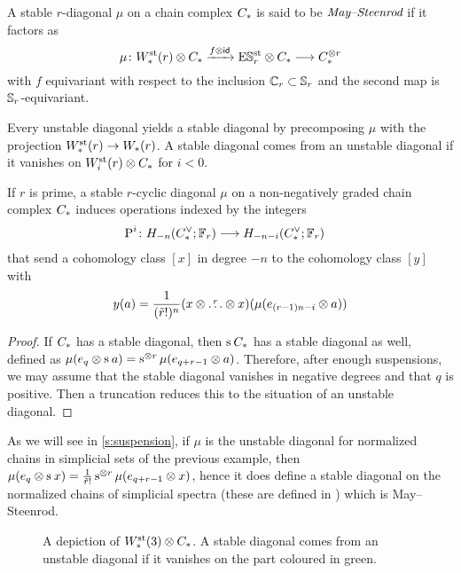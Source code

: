 \begin{definition}
	A stable $r$-diagonal $\mu$ on a chain complex $\ucadenas$ is said to be $\emph{May--Steenrod}$ if it factors as
	\[
	\mu \colon \Wst(r) \ot \ucadenas \xra{f \ot \id} \ESst_r \ot \ucadenas \lra \ucadenas^{\ot r}
	\]
	with $f$ equivariant with respect to the inclusion $\Cyc_r \subset \Sym_r$ and the second map is $\Sym_r$-equivariant.
\end{definition}

Every unstable diagonal yields a stable diagonal by precomposing $\mu$ with the projection $\Wst(r) \to \W(r)$.
A stable diagonal comes from an unstable diagonal if it vanishes on $\Wst[i](r) \ot \ucadenas$ for $i<0$.

\begin{proposition}
	If $r$ is prime, a stable $r$-cyclic diagonal $\mu$ on a non-negatively graded chain complex $\ucadenas$ induces operations indexed by the integers
	\begin{align*}
		\power^{i} \colon H_{-n}(\ucocadenas;\mathbb{F}_r)& \lra H_{-n-i}(\ucocadenas;\mathbb{F}_r)
	\end{align*}
	that send a cohomology class $[x]$ in degree $-n$ to the cohomology class $[y]$ with
	\[
	y(a) = \frac{1}{(\tilde{r}!)^n}(x \ot \overset{r}{\dots} \ot x)(\mu(e_{(r-1)n-i} \ot a))
	\]
\end{proposition}

\begin{proof}
	If $\ucadenas$ has a stable diagonal, then $\sus{} \ucadenas$ has a stable diagonal as well, defined as $\mu(e_q \ot \sus{} a) = \sus{\ot r}\mu(e_{q+r-1} \ot a)$.
	Therefore, after enough suspensions, we may assume that the stable diagonal vanishes in negative degrees and that $q$ is positive.
	Then a truncation reduces this to the situation of an unstable diagonal.
\end{proof}

\begin{example}
	As we will see in \cref{s:suspension}, if $\mu$ is the unstable diagonal for normalized chains in simplicial sets of the previous example, then $\mu(e_q \ot \sus{} x) = \frac{1}{\tilde{r}!}\sus{\ot r} \mu(e_{q+r-1} \ot x)$, hence it does define a stable diagonal on the normalized chains of simplicial spectra (these are defined in \cite{Gill2020}) which is May--Steenrod.
\end{example}

\begin{figure}
	
	\caption{A depiction of $\Wst(3) \ot \ucadenas$. A stable diagonal comes from an unstable diagonal if it vanishes on the part coloured in green.}
\end{figure}

